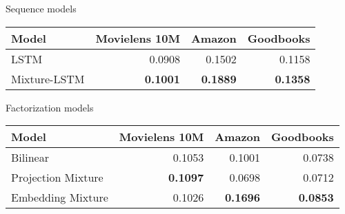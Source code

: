 \begin{subtable}{\columnwidth}
\caption{Sequence models}
\begin{tabularx}{\columnwidth}{lrrr}
\toprule
 Model        &   Movielens 10M &   Amazon &   Goodbooks \\
\midrule
 LSTM         &          0.0908 &   0.1502 &      0.1158 \\
 Mixture-LSTM &          \textbf{0.1001} &   \textbf{0.1889} &      \textbf{0.1358} \\
\bottomrule
\end{tabularx}
\end{subtable}
\hspace{\fill}
\begin{subtable}{\columnwidth}
\caption{Factorization models}
\begin{tabularx}{\columnwidth}{lrrr}
\toprule
 Model              &   Movielens 10M &   Amazon &   Goodbooks \\
\midrule
 Bilinear           &          0.1053 &   0.1001 &      0.0738 \\
 Projection Mixture &          \textbf{0.1097} &   0.0698 &      0.0712 \\
 Embedding Mixture  &          0.1026 &   \textbf{0.1696} &      \textbf{0.0853} \\
\bottomrule
\end{tabularx}
\end{subtable}
